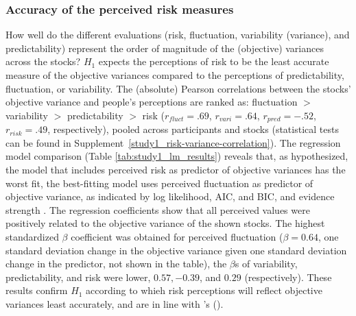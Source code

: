 \documentclass[a4paper,man, natbib,floatsintext]{apa6} %
\begin{document}
\subsubsection{Accuracy of the perceived risk measures}
How well do the different evaluations (risk, fluctuation, variability (variance), and  predictability) represent the order of magnitude of the (objective) variances across the stocks? $H_1$ expects the perceptions of risk to be the least accurate measure of the objective variances compared to the perceptions of predictability, fluctuation, or variability. The (absolute) Pearson correlations between the stocks' objective variance and people's perceptions are ranked as: fluctuation $>$ variability $>$ predictability $>$ risk ($r_{fluct}=.69$, $r_{vari}=.64$, $r_{pred}= -.52$, $r_{risk}= .49$, respectively), pooled across participants and stocks (statistical tests can be found in Supplement~\ref{study1_risk-variance-correlation}). The regression model comparison 
(Table \ref{tab:study1_lm_results}) reveals that, as hypothesized, the model that includes perceived risk as predictor of objective variances has the worst fit, the best-fitting model uses perceived fluctuation as predictor of objective variance, as indicated by log likelihood, AIC, and BIC, and evidence strength \citep[the best model has an AIC weight of 1, see][]{Wagenmakers2004}. The regression coefficients show that all perceived values were positively related to the objective variance of the shown stocks. The highest standardized $\beta$ coefficient was obtained for perceived fluctuation ($\beta = 0.64$, one standard deviation change in the objective variance given one standard deviation change in the predictor, not shown in the table), the $\beta$s of variability, predictability, and risk were lower, $ 0.57, -0.39$, and $0.29$ (respectively). These results confirm $H_1$ according to whieh risk perceptions will reflect objective variances least accurately, and are in line with \citeauthor{Klos2005a}'s (\citeyear{Klos2005a}).
\end{document}
